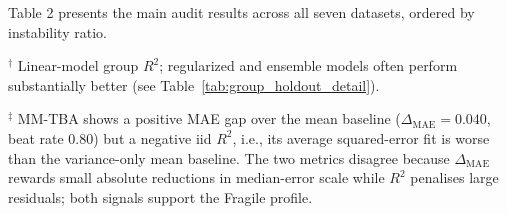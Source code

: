\documentclass[10pt,letterpaper]{article}
\begin{document}
Table 2 presents the main audit results across all seven datasets, ordered by instability ratio.

\begin{table}[htbp]
\centering
\caption{Seven-dataset audit comparison. $I_{\mathrm{lin}}$ and $I_{\mathrm{gbt}}$ are instability ratios for linear and Gradient Boosting models. Beat rate is the fraction of 100 splits where the linear model outperforms the mean baseline. Perm\% is the fraction of tested splits with permutation $p < 0.05$. Group $R^2$ is the mean leave-one-group-out $R^2$ for the linear model; iid $R^2$ is the mean $R^2$ under random splitting.}
\label{tab:seven_dataset_audit}
%
\par\vspace{4pt}
\begin{flushleft}\footnotesize
$^{\dagger}$ Linear-model group $R^2$; regularized and ensemble models often perform substantially better (see Table~\ref{tab:group_holdout_detail}).\par
$^{\ddag}$ MM-TBA shows a positive MAE gap over the mean baseline ($\Delta_{\mathrm{MAE}} = 0.040$, beat rate $0.80$) but a negative iid $R^2$, i.e., its average squared-error fit is worse than the variance-only mean baseline. The two metrics disagree because $\Delta_{\mathrm{MAE}}$ rewards small absolute reductions in median-error scale while $R^2$ penalises large residuals; both signals support the Fragile profile.\par

\end{flushleft}
\end{table}
\end{document}
